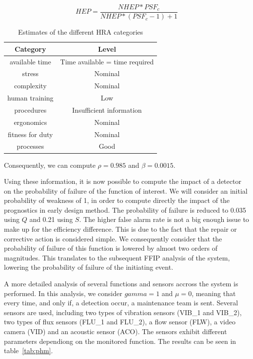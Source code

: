\begin{equation}
HEP = \frac{NHEP * PSF_c}{NHEP * (PSF_c-1) + 1}
\label{eq:hra}
\end{equation}

\begin{table}[t]
\centering
\caption{Estimates of the different HRA categories}
\label{tab:hra}
\begin{tabular}{|c|c|}
\hline
Category         & Level                          \\ \hline \hline
available time   & Time available = time required \\ \hline
stress           & Nominal                        \\ \hline
complexity       & Nominal                        \\ \hline
human training   & Low                            \\ \hline
procedures       & Insufficient information       \\ \hline
ergonomics       & Nominal                        \\ \hline
fitness for duty & Nominal                        \\ \hline
processes        & Good                           \\ \hline
\end{tabular}
\end{table}

Consequently, we can compute $\rho = 0.985$ and $\beta = 0.0015$.

Using these information, it is now possible to compute the impact of a detector on the probability of failure of the function of interest. We will consider an initial probability of weakness of 1, in order to compute directly the impact of the prognostics in early design method. The probability of failure is reduced to 0.035 using $Q$ and 0.21 using $S$. The higher false alarm rate is not a  big enough issue to make up for the efficiency difference. This is due to the fact that the repair or corrective action is considered simple. We consequently consider that the probability of failure of this function is lowered by almost two orders of magnitudes. This translates to the subsequent FFIP analysis of the system, lowering the probability of failure of the initiating event.

A more detailed analysis of several functions and sensors accross the system is performed. In this analysis, we consider $gamma = 1$ and $\mu = 0$, meaning that every time, and only if, a detection occur, a maintenance team is sent. Several sensors are used, including two types of vibration sensors (VIB\_1 and VIB\_2), two types of flux sensors (FLU\_1 and FLU\_2), a flow sensor (FLW), a video camera (VID) and an acoustic sensor (ACO). The sensors exhibit different parameters dependiong on the monitored function. The results can be seen in table~\ref{tab:phm}.

